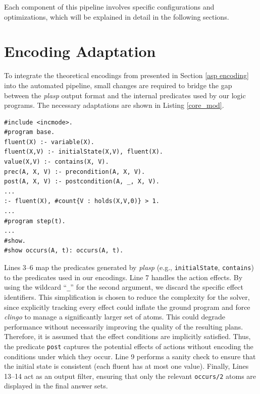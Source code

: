 \documentclass[
     11pt,                    %
     a4paper,             %
     BCOR=10mm,     %
     DIV=14,                 %
     listof=totoc,                    %
     bibliography=totoc,       %
     index=totoc,              %
     parskip            %
     twoside,
     headsepline
     ]{scrreprt}
\theoremstyle{definition}
\theoremstyle{definition}
\theoremstyle{remark}
\theoremstyle{bfnote}
\begin{document}
Each component of this pipeline involves specific configurations and optimizations, which will be explained in detail in the following sections.


\section{Encoding Adaptation}
To integrate the theoretical encodings from \textcite{DIMOPOULOS_2019} presented in Section \ref{asp encoding} into the automated pipeline, small changes are required to bridge the gap between the \textit{plasp} output format and the internal predicates used by our logic programs.
The necessary adaptations are shown in Listing \ref{core_mod}.
\begin{listing}[H]
\caption{Modifications to the Core Encoding}
\label{core_mod}
\begin{verbatim}
#include <incmode>.
#program base.
fluent(X) :- variable(X).
fluent(X,V) :- initialState(X,V), fluent(X).
value(X,V) :- contains(X, V).
prec(A, X, V) :- precondition(A, X, V).
post(A, X, V) :- postcondition(A, _, X, V).
...
:- fluent(X), #count{V : holds(X,V,0)} > 1.
...
#program step(t).
...
#show.
#show occurs(A, t): occurs(A, t).
\end{verbatim}
\end{listing}

Lines 3--6 map the predicates generated by \textit{plasp} (e.g., \texttt{initialState}, \texttt{contains}) to the predicates used in our encodings.
Line 7 handles the action effects. 
By using the wildcard \enquote{\texttt{\_}} for the second argument, we discard the specific effect identifiers. This simplification is chosen to reduce the complexity for the solver, since explicitly tracking every effect could inflate the ground program and force \textit{clingo} to manage a significantly larger set of atoms. This could degrade performance without necessarily improving the quality of the resulting plans. Therefore, it is assumed that the effect conditions are implicitly satisfied. Thus, the predicate \texttt{post}  captures the potential effects of actions without encoding the conditions under which they occur.
Line 9 performs a sanity check to ensure that the initial state is consistent (each fluent has at most one value).
Finally, Lines 13--14 act as an output filter, ensuring that only the relevant \texttt{occurs/2} atoms are displayed in the final answer sets.
\end{document}
